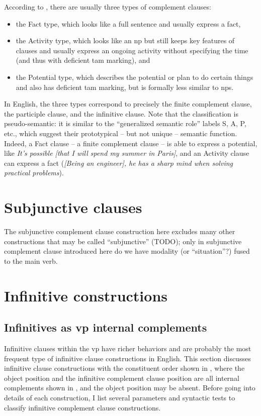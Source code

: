 \documentclass[UTF8, a4paper, oneside, scheme=plain, 12pt]{ctexbook}
\newcommand*{\citesec}[1]{\S~{#1}}
\newcommand{\form}[1]{\emph{#1}}
\begin{document}
According to \citet[\citesec{18.4}]{dixon2010basic2},
there are usually three types of complement clauses:
\begin{itemize}
    \item the Fact type, which looks like a full sentence
    and usually express a fact, 
    \item the Activity type, which looks like an \acs{np}
    but still keeps key features of clauses 
    and usually express an ongoing activity 
    without specifying the time (and thus with deficient \acs{tam} marking), and 
    \item the Potential type,
    which describes the potential or plan to do certain things 
    and also has deficient \acs{tam} marking,
    but is formally less similar to \acs{np}s.
\end{itemize}
In English, the three types correspond to precisely 
the finite complement clause,
the participle clause,
and the infinitive clause.
Note that the classification is pseudo-semantic:
it is similar to the ``generalized semantic role'' labels S, A, P, etc.,
which suggest their prototypical -- but not unique -- semantic function.
Indeed, a Fact clause -- a finite complement clause -- 
is able to express a potential,
like \form{It's possible [that I will spend my summer in Paris]},
and an Activity clause can express a fact 
(\form{[Being an engineer], he has a sharp mind when solving practical problems}).

\section{Subjunctive clauses}\label{sec:complement.subjunctive}

The subjunctive complement clause construction here 
excludes many other constructions that may be called ``subjunctive'' (TODO);
only in subjunctive complement clause introduced here 
do we have modality (or ``situation''?) fused to the main verb.

\section{Infinitive constructions}

\subsection{Infinitives as \acs{vp} internal complements}

Infinitive clauses within the \acs{vp} have richer behaviors and are probably the most frequent type of infinitive clause constructions in English.
This section discusses infinitive clause constructions with the constituent order 
shown in ,
where the object position and the infinitive complement clause position 
are all internal complements shown in ,
and the object position may be absent.
Before going into details of each construction,
I list several parameters and syntactic tests 
to classify infinitive complement clause constructions.
\end{document}
